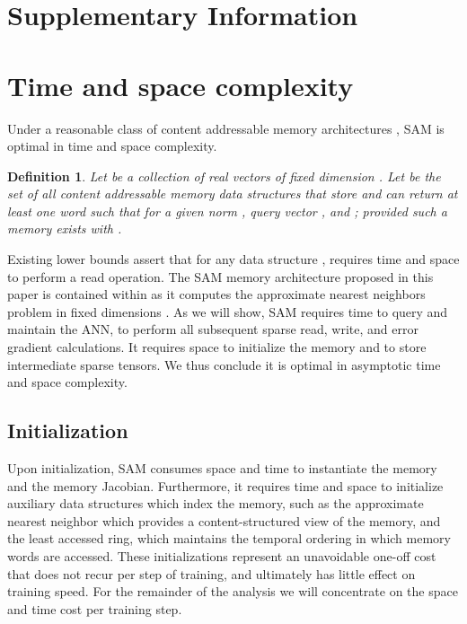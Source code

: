 \documentclass{article}
\newtheorem{definition}{Definition}
\begin{document}
\small
{}


\newpage
\appendix

\section*{Supplementary Information}

\section{Time and space complexity}
\label{sec:space_time_suppl}

Under a reasonable class of content addressable memory architectures , SAM is optimal in time and space complexity.

\begin{definition}
\label{label:def_cam}
Let  be a collection of real vectors  of fixed dimension . Let  be the set of all content addressable memory data structures that store  and can return at least one word  such that  for a given  norm , query vector , and ; provided such a memory  exists with .
\end{definition}

Existing lower bounds \cite{motwani2007lower,arya1998optimal} assert that for any data structure ,   requires  time and  space to perform a read operation. The SAM memory architecture proposed in this paper is contained within  as it computes the approximate nearest neighbors problem in fixed dimensions \cite{flann_pami_2014}. As we will show, SAM requires  time to query and maintain the ANN,  to perform all subsequent sparse read, write, and error gradient calculations. It requires  space to initialize the memory and  to store intermediate sparse tensors. We thus conclude it is optimal in asymptotic time and space complexity.


\subsection{Initialization}
Upon initialization, SAM consumes  space and time to instantiate the memory and the memory Jacobian. Furthermore, it requires  time and space to initialize auxiliary data structures which index the memory, such as the approximate nearest neighbor which provides a content-structured view of the memory, and the least accessed ring, which maintains the temporal ordering in which memory words are accessed. These initializations represent an unavoidable one-off cost that does not recur per step of training, and ultimately has little effect on training speed. For the remainder of the analysis we will concentrate on the space and time cost per training step.
\end{document}
